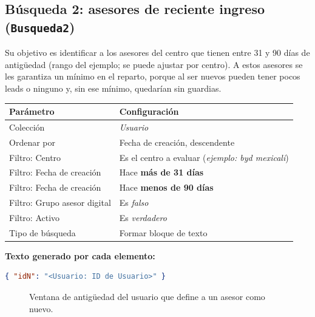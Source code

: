 \documentclass[11pt,a4paper]{article}
\begin{document}
\subsection{Búsqueda 2: asesores de reciente ingreso (\texttt{Busqueda2})}

Su objetivo es identificar a los asesores del centro que tienen entre 31 y 90 días de antigüedad (rango del ejemplo; se puede ajustar por centro). A estos asesores se les garantiza un mínimo en el reparto, porque al ser nuevos pueden tener pocos leads o ninguno y, sin ese mínimo, quedarían sin guardias.

\begin{longtable}{@{}p{4.2cm}p{10.6cm}@{}}
\toprule
\textbf{Parámetro} & \textbf{Configuración} \\
\midrule
\endhead
Colección & \emph{Usuario} \\
Ordenar por & Fecha de creación, descendente \\
Filtro: Centro & Es el centro a evaluar (\emph{ejemplo: byd mexicali}) \\
Filtro: Fecha de creación & Hace \textbf{más de 31 días} \\
Filtro: Fecha de creación & Hace \textbf{menos de 90 días} \\
Filtro: Grupo asesor digital & Es \emph{falso} \\
Filtro: Activo & Es \emph{verdadero} \\
Tipo de búsqueda & Formar bloque de texto \\
\bottomrule
\end{longtable}

\textbf{Texto generado por cada elemento:}

\begin{lstlisting}[style=codigo,language=json]
{ "idN": "<Usuario: ID de Usuario>" }
\end{lstlisting}

\begin{figure}[h!]
\centering
{}
\caption{Ventana de antigüedad del usuario que define a un asesor como nuevo.}
\end{figure}
\end{document}
